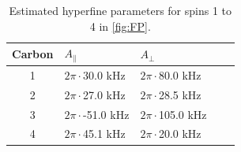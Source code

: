 \begin{table}[htbp]
    \begin{tabular}{cllll}
    Carbon & \quad \quad  $A_{\parallel} $ & \quad \quad $A_{\perp}$ \\ \hline
    1         & $2 \pi \cdot$30.0 kHz             & $2 \pi \cdot$80.0 kHz                \\
    2         & $2 \pi \cdot$27.0 kHz             & $2 \pi \cdot$28.5 kHz              \\
    3         & $2 \pi \cdot$-51.0 kHz          & $2 \pi \cdot$105.0 kHz              \\
    4         & $2 \pi \cdot$45.1 kHz           & $2 \pi \cdot$20.0 kHz                \\
    \end{tabular}
    \caption{Estimated hyperfine parameters for spins 1 to 4 in \cref{fig:FP}.}
    \label{tbl:HF_par}
\end{table}

